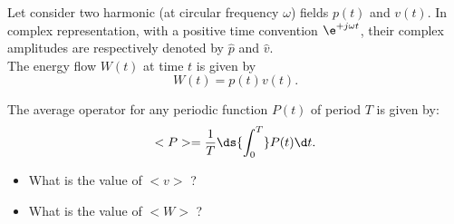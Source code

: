 \bexo
Let consider two harmonic (at circular frequency $\omega$) fields $p(t)$ and $v(t)$. In complex representation, with a positive time convention $\e^{+j\omega t}$, their complex amplitudes are respectively denoted by $\hat{p}$ and $\hat{v}$.\\

The energy flow $W(t)$ at time $t$ is given by 
\begin{equation} 
W(t)=p(t)v(t).
\end{equation}

The average operator for any periodic function $P(t)$ of period $T$ is given by:
\begin{equation}
<P>=\dfrac{1}{T} \ds{\int_0^{T}} P(t) \d t.
\end{equation}

\begin{itemize}
\item What is the value of $<v>$ ?
\item What is the value of $<W>$ ? 
\end{itemize}\eexo


